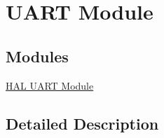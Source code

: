 \hypertarget{group__uart}{}\section{U\+A\+R\+T Module}
\label{group__uart}
\subsection*{Modules}
\begin{DoxyCompactItemize}
\item 
\hyperlink{group__hal__uart}{H\+A\+L U\+A\+R\+T Module}
\end{DoxyCompactItemize}


\subsection{Detailed Description}
